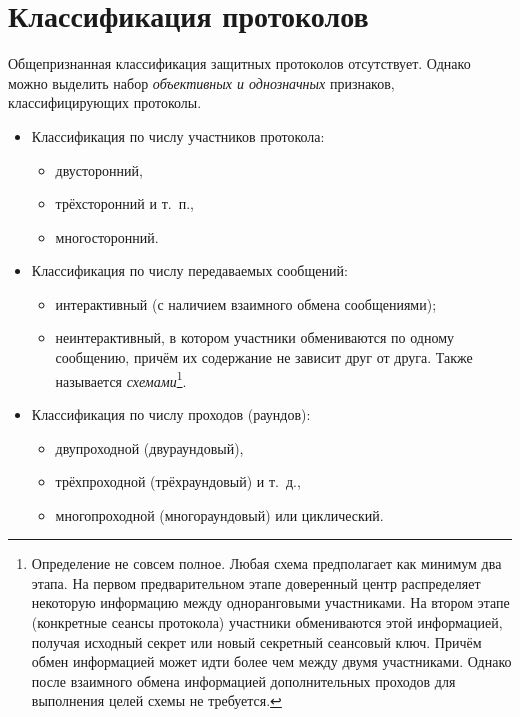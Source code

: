 \section{Классификация протоколов}\label{section-protocols-classification}

Общепризнанная классификация защитных протоколов отсутствует. Однако можно выделить набор \emph{объективных и однозначных} признаков, классифицирующих протоколы.

\begin{itemize}
    \item Классификация по числу участников протокола:
    \begin{itemize}
        \item двусторонний, 
        \item трёхсторонний и т.~п., 
        \item многосторонний.
    \end{itemize}
    \item Классификация по числу передаваемых сообщений:
    \begin{itemize}
        \item интерактивный (с наличием взаимного обмена сообщениями);
        \item неинтерактивный, в котором участники обмениваются по одному сообщению, причём их содержание не зависит друг от друга. Также называется \emph{схемами}\footnote{Определение не совсем полное. Любая схема предполагает как минимум два этапа. На первом предварительном этапе доверенный центр распределяет некоторую информацию между одноранговыми участниками. На втором этапе (конкретные сеансы протокола) участники обмениваются этой информацией, получая исходный секрет или новый секретный сеансовый ключ. Причём обмен информацией может идти более чем между двумя участниками. Однако после взаимного обмена информацией дополнительных проходов для выполнения целей схемы не требуется.}.
    \end{itemize}
    \item Классификация по числу проходов (раундов):
    \begin{itemize}
        \item двупроходной (двураундовый),
        \item трёхпроходной (трёхраундовый) и т.~д.,
        \item многопроходной (многораундовый) или циклический.

\end{itemize}
\end{itemize}
